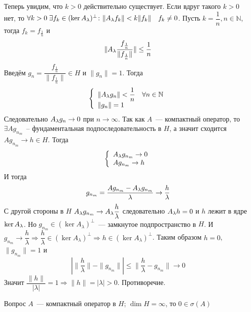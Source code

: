 \documentclass[14pt]{extarticle}
\begin{document}
\begin{Proof}
    Теперь увидим, что $k > 0$ действительно существует.
    Если вдруг такого $k > 0$ нет, то
    $\forall k > 0\; \exists f_k \in (\ker A_\lambda)^\perp\colon \|\Al f_k\| 
    < k \|f_k\|\quad f_k \ne 0$.
    Пусть $k = \dfrac{1}{n}, n \in \mathbb N$, тогда $f_k = f_{\frac{1}{n}}$ и
    $$
    \|\Al \dfrac{f_{\frac{1}{n}}}{\|f_{\frac{1}{n}}\|}\| \le \dfrac{1}{n}
    $$
    Введём $g_n = \dfrac{f_{\frac{1}{n}}}{\|f_{\frac{1}{n}}\|} \in H$ и $\|g_n
    \| = 1$.
    Тогда
    $$
    \left\{
        \begin{array}{l}
            \|{\Al} g_n\| < \dfrac{1}{n} \quad \forall n \in \mathbb N\\
            \|g_n\| = 1
        \end{array}
    \right.
    $$
    Следовательно $\Al g_n \to 0$ при $n \to \infty$.
    Так как $A$~--- компактный оператор, то $\exists A g_{n_m}$~--
    фундаментальная подпоследовательность в $H$, а значит сходится $Ag_{n_m}
    \to h \in H$.
    Тогда
    $$
    \left\{
        \begin{array}{l}
            {\Al} g_{n_m} \to 0\\
            A g_{n_m} \to h
        \end{array}
    \right.
    $$
    И тогда
    $$
    g_{n_m} = \dfrac{A g_{n_m} - \Al g_{n_m}}{\lambda} \to \dfrac{h}{\lambda}
    $$
    С другой стороны в $H$ $\Al g_{n_m} \to \Al \dfrac{h}{\lambda}$ 
    следовательно $\Al h = 0$ и $h$ лежит в ядре $\ker \Al$.
    Но $g_{n_m} \in (\ker A_\lambda)^\perp$~--- замкнутое подпространство в 
    $H$.
    И $g_{n_m} \to \dfrac{h}{\lambda} \Rightarrow \dfrac{h}{\lambda} \in 
    (\ker A_\lambda)^\perp \Rightarrow h \in (\ker A_\lambda)^\perp$.
    Таким образом $h = 0$, $\|g_{n_m}\| = 1$ и
    $$
    |\|\dfrac{h}{\lambda}\| - \|g_{n_m}\|| \le \|\dfrac{h}{\lambda} - g_{n_m}\|
    \to 0
    $$
    Значит $\dfrac{\|h\|}{|\lambda|} = 1 \Rightarrow  \|h\| = |\lambda| > 0$.
    Противоречие.
\end{Proof}
\begin{MathCl}{Вопрос}
    $A$~--- компактный оператор в $H$; $\dim H = \infty$, то $0 \in \sigma(A)
    $
\end{MathCl}
\end{document}
